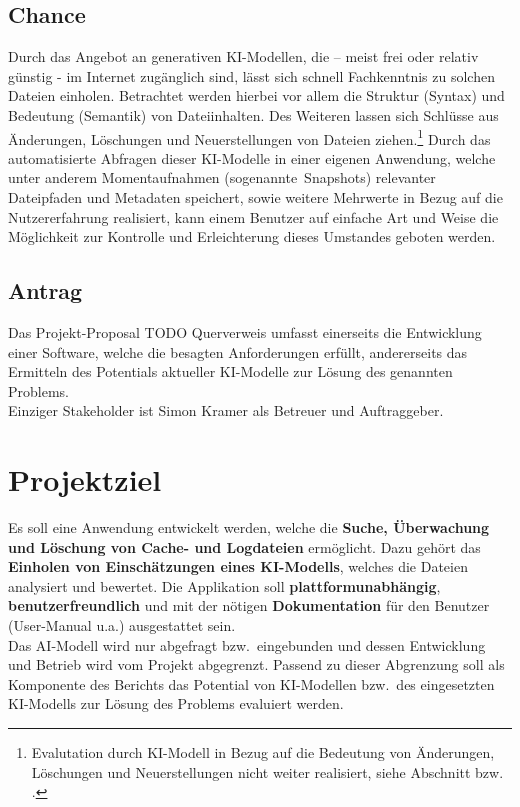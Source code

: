 \documentclass[a4paper,12pt]{report}
\begin{document}
    \subsection{Chance}\label{subsec:chance}
    Durch das Angebot an generativen KI-Modellen, die – meist frei oder relativ günstig - im
    Internet zugänglich sind, lässt sich schnell Fachkenntnis zu solchen Dateien einholen.
    Betrachtet werden hierbei vor allem die Struktur (Syntax) und Bedeutung (Semantik) von Dateiinhalten.
    Des Weiteren lassen sich Schlüsse aus Änderungen, Löschungen und Neuerstellungen von Dateien ziehen.\footnote{Evalutation durch KI-Modell in Bezug auf die Bedeutung von Änderungen, Löschungen und Neuerstellungen nicht weiter realisiert, siehe Abschnitt  bzw. .}
    Durch das automatisierte Abfragen dieser KI-Modelle in einer eigenen Anwendung,
    welche unter anderem Momentaufnahmen (sogenannte\ Snapshots) relevanter Dateipfaden und Metadaten speichert,
    sowie weitere Mehrwerte in Bezug auf die Nutzererfahrung realisiert, kann einem
    Benutzer auf einfache Art und Weise die Möglichkeit zur Kontrolle und Erleichterung dieses Umstandes
    geboten werden.

    \subsection{Antrag}\label{subsec:stakeholder}
    Das Projekt-Proposal TODO Querverweis umfasst einerseits die Entwicklung einer Software, welche die besagten Anforderungen erfüllt,
    andererseits das Ermitteln des Potentials aktueller KI-Modelle zur Lösung des genannten Problems.\\
    Einziger Stakeholder ist Simon Kramer als Betreuer und Auftraggeber.\\


    \section{Projektziel}\label{sec:projektziel}
    Es soll eine Anwendung entwickelt werden, welche die \textbf{Suche, Überwachung und Löschung von Cache- und Logdateien} ermöglicht.
    Dazu gehört das \textbf{Einholen von Einschätzungen eines KI-Modells}, welches die Dateien analysiert und bewertet.
    Die Applikation soll \textbf{plattformunabhängig}, \textbf{benutzerfreundlich} und mit der nötigen \textbf{Dokumentation} für den Benutzer (User-Manual u.a.) ausgestattet sein.
    \\Das AI-Modell wird nur abgefragt bzw.\ eingebunden und dessen Entwicklung und Betrieb
    wird vom Projekt abgegrenzt.
    Passend zu dieser Abgrenzung soll als Komponente des Berichts das Potential von KI-Modellen bzw.\ des eingesetzten KI-Modells zur Lösung des Problems evaluiert werden.
\end{document}
